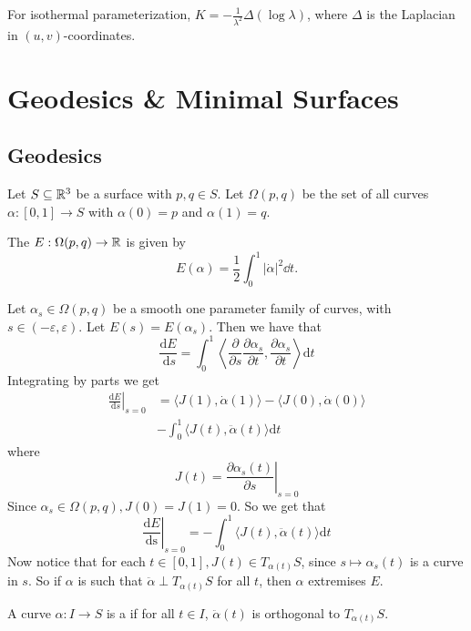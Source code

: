 \documentclass[10pt]{article}
\begin{document}
\begin{proposition}
    For isothermal parameterization, $K = -\frac{1}{\lambda^2} \Delta(\log \lambda)$, where $\Delta$ is the Laplacian in $(u, v)$-coordinates.
\end{proposition}

\section{Geodesics \& Minimal Surfaces}

\subsection{Geodesics}

Let $S \subseteq \mathbb{R}^3$ be a surface with $p, q \in S$. Let $\Omega(p, q)$ be the set of all curves $\alpha: [0, 1] \rightarrow S$ with $\alpha(0) = p$ and $\alpha(1) = q$.

\begin{definition}
The  $E: \Omega(p, q) \rightarrow \mathbb{R}$ is given by
$$
E(\alpha) = \frac{1}{2} \int_0^1 |\dot\alpha|^2 \dd t.
$$
\end{definition}

Let $\alpha_s \in \Omega(p, q)$ be a smooth one parameter family of curves, with $s \in(-\varepsilon, \varepsilon)$. Let $E(s)=E\left(\alpha_s\right)$. Then we have that
$$
\frac{\mathrm{d} E}{\mathrm{~d} s}=\int_0^1\left\langle\frac{\partial}{\partial s} \frac{\partial \alpha_s}{\partial t}, \frac{\partial \alpha_s}{\partial t}\right\rangle \mathrm{d} t
$$
Integrating by parts we get
\begin{align*}
\left.\frac{\mathrm{d} E}{\mathrm{~d} s}\right|_{s=0}&=\langle J(1), \dot{\alpha}(1)\rangle-\langle J(0), \dot{\alpha}(0)\rangle\\&-\int_0^1\langle J(t), \ddot{\alpha}(t)\rangle \mathrm{d} t
\end{align*}
where
$$
J(t)=\left.\frac{\partial \alpha_s(t)}{\partial s}\right|_{s=0}
$$
Since $\alpha_s \in \Omega(p, q), J(0)=J(1)=0$. So we get that
$$
\left.\frac{\mathrm{d} E}{\mathrm{ds}}\right|_{s=0}=-\int_0^1\langle J(t), \ddot{\alpha}(t)\rangle \mathrm{d} t
$$
Now notice that for each $t \in[0,1], J(t) \in T_{\alpha(t)} S$, since $s \mapsto \alpha_s(t)$ is a curve in $s$. So if $\alpha$ is such that $\ddot{\alpha} \perp T_{\alpha(t)} S$ for all $t$, then $\alpha$ extremises $E$.

\begin{definition}[Geodesic]
    A curve $\alpha : I \rightarrow S$ is a  if for all $t \in I$, $\ddot{\alpha}(t)$ is orthogonal to $T_{\alpha(t)} S$.
\end{definition}
\end{document}
